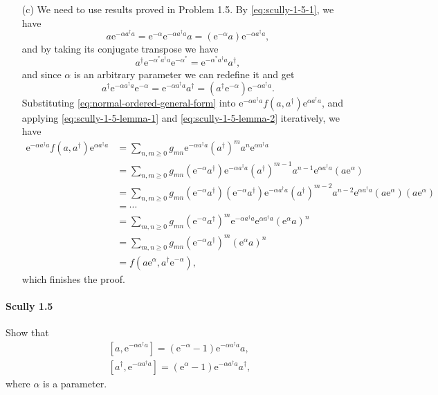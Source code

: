 \documentclass[hyperref, a4paper]{article}
\newcommand*{\ee}{\mathrm{e}}
\begin{document}
\begin{itemize}
\begin{equation}
\end{equation}
\item[(c)] We need to use results proved in Problem 1.5. By \eqref{eq:scully-1-5-1}, we have
\begin{equation}
    a \ee^{- \alpha a^\dagger a} = \ee^{- \alpha} \ee^{- \alpha a^\dagger a} a = (\ee^{-\alpha} a) \ee^{- \alpha a^\dagger a}, 
    \label{eq:scully-1-5-lemma-1}
\end{equation}
and by taking its conjugate transpose we have
\[
    a^\dagger \ee^{- \alpha^* a^\dagger a} \ee^{- \alpha^*} = \ee^{- \alpha^* a^\dagger a} a^\dagger,
\]
and since $\alpha$ is an arbitrary parameter we can redefine it and get
\begin{equation}
    a^\dagger \ee^{- \alpha a^\dagger a} \ee^{- \alpha} = \ee^{- \alpha a^\dagger a} a^\dagger = (a^\dagger \ee^{-\alpha}) \ee^{- \alpha a^\dagger a}.
    \label{eq:scully-1-5-lemma-2}
\end{equation}
Substituting \eqref{eq:normal-ordered-general-form} into $\ee^{-\alpha a^\dagger a} f(a, a^\dagger) \ee^{\alpha a^\dagger a}$, and applying \eqref{eq:scully-1-5-lemma-1} and \eqref{eq:scully-1-5-lemma-2} iteratively, we have
\[
    \begin{aligned}
        \ee^{-\alpha a^\dagger a} f(a, a^\dagger) \ee^{\alpha a^\dagger a} &= \sum_{n, m \geq 0} g_{mn} \ee^{-\alpha a^\dagger a} (a^\dagger)^m a^n \ee^{\alpha a^\dagger a} \\
        &= \sum_{n, m \geq 0} g_{mn} (\ee^{-\alpha} a^\dagger) \ee^{-\alpha a^\dagger a} (a^\dagger)^{m-1} a^{n-1} \ee^{\alpha a^\dagger a} (a \ee^{\alpha}) \\
        &= \sum_{n, m \geq 0} g_{mn} (\ee^{-\alpha} a^\dagger) (\ee^{-\alpha} a^\dagger) \ee^{-\alpha a^\dagger a} (a^\dagger)^{m-2} a^{n-2} \ee^{\alpha a^\dagger a} (a \ee^{\alpha}) (a \ee^{\alpha}) \\
        &= \cdots \\
        &= \sum_{m, n \geq 0} g_{mn} (\ee^{-\alpha} a^\dagger)^m \ee^{-\alpha a^\dagger a} \ee^{\alpha a^\dagger a} (\ee^{\alpha} a)^n \\
        &= \sum_{m, n \geq 0} g_{mn} (\ee^{-\alpha} a^\dagger)^m (\ee^{\alpha} a)^n \\
        &= f(a \ee^{\alpha}, a^\dagger \ee^{-\alpha}),
    \end{aligned}
\]
which finishes the proof.
\end{itemize}

\paragraph{Scully 1.5} Show that
\begin{equation}
    \begin{gathered}
        {\left[a, \ee^{-\alpha a^{\dagger} a}\right]=\left(\ee^{-\alpha}-1\right) \ee^{-\alpha a^{\dagger} a} a}, \\
        {\left[a^{\dagger}, \ee^{-\alpha a^{\dagger} a}\right]=\left(\ee^{\alpha}-1\right) \ee^{-\alpha a^{\dagger} a} a^{\dagger}},
        \end{gathered}
    \label{eq:scully-1-5-1}
\end{equation}
where $\alpha$ is a parameter.
\end{document}

